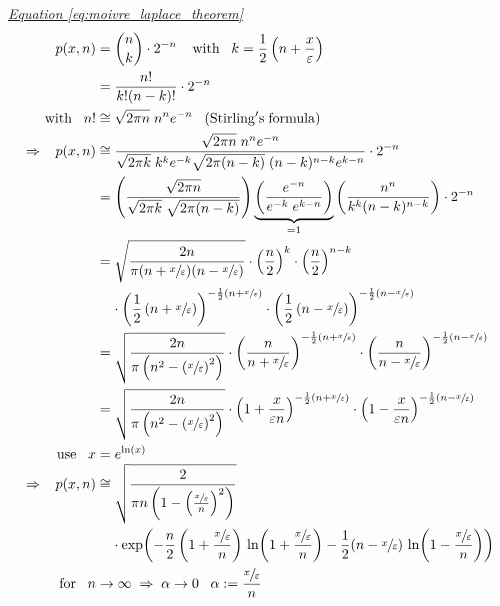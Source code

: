 \documentclass[a4paper, parskip=half]{scrartcl}
\newcommand{\myEqRef}[1]{\textit{\hyperref[eq:#1]{Equation \ref*{eq:#1}}}}
\begin{document}
\myEqRef{moivre_laplace_theorem}
\begin{align}
p(x,n) &= \binom{n}{k} \cdot 2^{-n}\;\;\;\; \mathrm{with}\;\;\; k = \frac{1}{2}\left(n+\frac{x}{\varepsilon}\right)\\
&= \frac{n!}{k!(n-k)!}\cdot 2^{-n}\\
\mathrm{with}\;\;\; n! &\cong \sqrt{2\pi n}\;n^ne^{-n}\;\;\;\mathrm{(Stirling's\;formula)}\\
\Rightarrow \;\;\; p(x,n) &\cong \frac{\sqrt{2\pi n}\;n^ne^{-n}}{\sqrt{2\pi k}\;k^ke^{-k} \sqrt{2\pi(n-k)}\;(n-k)^{n-k}e^{k-n}} \cdot 2^{-n}\\
&= \left(\frac{\sqrt{2\pi n}}{\sqrt{2\pi k}\;\sqrt{2\pi(n-k)}} \right) \underbrace{\left(\frac{e^{-n}}{e^{-k}\;e^{k-n}}\right)}_{=1} \left( \frac{n^n}{k^k(n-k)^{n-k}}\right)\cdot 2^{-n}\\
&= \sqrt{\frac{2n}{\pi(n+\sfrac{x}{\varepsilon})(n-\sfrac{x}{\varepsilon})}} \cdot \left(\frac{n}{2} \right)^k \cdot \left(\frac{n}{2} \right)^{n-k} \notag\\
&\;\;\;\;\cdot \left( \frac{1}{2}\left( n+\sfrac{x}{\varepsilon}\right) \right)^{-\frac{1}{2}(n+\sfrac{x}{\varepsilon})} \cdot \left( \frac{1}{2}\left( n-\sfrac{x}{\varepsilon}\right) \right)^{-\frac{1}{2}(n-\sfrac{x}{\varepsilon})} \\
&= \sqrt{\frac{2n}{\pi \left(n^2 - \left( \sfrac{x}{\varepsilon} \right)^2 \right)}} \cdot \left( \frac{n}{n+\sfrac{x}{\varepsilon}}\right)^{-\frac{1}{2}(n+\sfrac{x}{\varepsilon})} \cdot \left( \frac{n}{n-\sfrac{x}{\varepsilon}}\right)^{-\frac{1}{2}(n-\sfrac{x}{\varepsilon})} \\
&= \sqrt{\frac{2n}{\pi \left(n^2 - \left( \sfrac{x}{\varepsilon} \right)^2 \right)}} \cdot \left( 1 + \frac{x}{\varepsilon n}\right)^{-\frac{1}{2}(n+\sfrac{x}{\varepsilon})} \cdot \left( 1 - \frac{x}{\varepsilon n}\right)^{-\frac{1}{2}(n-\sfrac{x}{\varepsilon})} \\
\mathrm{use} \;\;\; x &= e^{\ln(x)}\\
\Rightarrow \;\;\; p(x,n) &\cong \sqrt{\frac{2}{\pi n\left(1 - \left( \frac{\sfrac{x}{\varepsilon}}{n} \right)^2 \right)}} \notag\\
&\;\;\;\;\cdot \exp\!\left(-\frac{n}{2}\left( 1+\frac{\sfrac{x}{\varepsilon}}{n} \right) \, \ln\!\left(1 + \frac{\sfrac{x}{\varepsilon}}{n} \right) -\frac{1}{2}(n-\sfrac{x}{\varepsilon})\, \ln\!\left(1 - \frac{\sfrac{x}{\varepsilon}}{n} \right) \right) \\
\mathrm{for}\;\;\; n &\rightarrow\infty \; \Rightarrow \; \alpha \rightarrow 0 \;\;\; \alpha := \frac{\sfrac{x}{\varepsilon}}{n}\; \\ 

\end{align}
\end{document}
